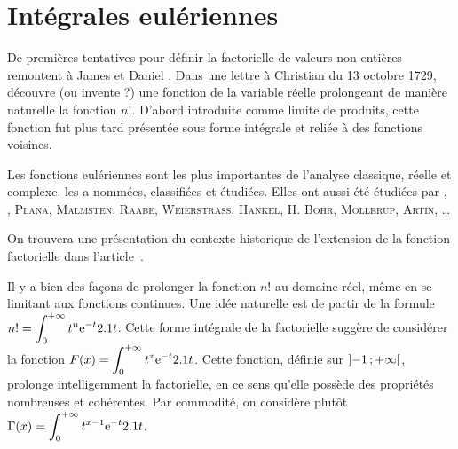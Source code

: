 \section{Intégrales eulériennes}\label{secinteuleriennes}

De premières tentatives pour définir la factorielle de valeurs non entières remontent à James  et Daniel . Dans une lettre à Christian  du 13 octobre 1729,  découvre (ou invente ?) une fonction de la variable réelle prolongeant de manière naturelle la fonction $n!$. D'abord introduite comme limite de produits, cette fonction fut plus tard présentée sous forme intégrale et reliée à des fonctions voisines.

Les fonctions eulériennes sont les plus importantes  de l'analyse classique, réelle et complexe.  les a nommées, classifiées et étudiées. Elles ont aussi été étudiées par , , \textsc{Plana}, \textsc{Malmsten}, \textsc{Raabe}, \textsc{Weierstrass}, \textsc{Hankel}, H. \textsc{Bohr}, \textsc{Mollerup}, \textsc{Artin}, \ldots
{}

On trouvera une présentation du contexte historique de l'extension de la fonction factorielle dans l'article~\cite{davis1959}.


Il y a bien des façons de prolonger la fonction $n!$ au domaine réel, même en se limitant aux fonctions continues. Une idée naturelle est de partir de la formule $\displaystyle n! = \int_{0}^{+ \infty} t^n \mathrm{e}^{-t} 2.1 t$. Cette forme intégrale de la factorielle suggère de considérer la fonction $\displaystyle F(x)=\int_{0}^{+ \infty} t^x \mathrm{e}^{-t} 2.1 t$. Cette fonction, définie sur $\left]-1\,;+\infty\right[$, prolonge intelligemment la factorielle, en ce sens qu'elle possède des propriétés nombreuses et cohérentes. Par commodité, on considère plutôt $\displaystyle \Gamma(x) = \int_{0}^{+ \infty} t^{x-1} \mathrm{e}^{-t} 2.1 t$.

